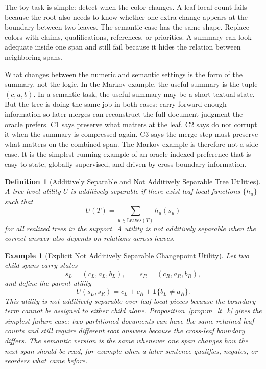 \documentclass[11pt]{article}
\newtheorem{definition}{Definition}
\newtheorem{example}{Example}
\begin{document}
The toy task is simple: detect when the color changes. A leaf-local count fails because the root also needs to know whether one extra change appears at the boundary between two leaves. The semantic case has the same shape. Replace colors with claims, qualifications, references, or priorities. A summary can look adequate inside one span and still fail because it hides the relation between neighboring spans.

What changes between the numeric and semantic settings is the form of the summary, not the logic. In the Markov example, the useful summary is the tuple $(c,a,b)$. In a semantic task, the useful summary may be a short textual state. But the tree is doing the same job in both cases: carry forward enough information so later merges can reconstruct the full-document judgment the oracle prefers. C1 says preserve what matters at the leaf. C2 says do not corrupt it when the summary is compressed again. C3 says the merge step must preserve what matters on the combined span. The Markov example is therefore not a side case. It is the simplest running example of an oracle-indexed preference that is easy to state, globally supervised, and driven by cross-boundary information.

\begin{definition}[Additively Separable and Not Additively Separable Tree Utilities]\label{def:nonseparable}
A tree-level utility $U$ is additively separable if there exist leaf-local functions $\{h_u\}$ such that
\[
U(T)=\sum_{u\in\mathrm{Leaves}(T)} h_u(s_u)
\]
for all realized trees in the support. A utility is not additively separable when the correct answer also depends on relations across leaves.
\end{definition}

\begin{example}[Explicit Not Additively Separable Changepoint Utility]\label{ex:changepoint-nonseparable}
Let two child spans carry states
\[
s_L=(c_L,a_L,b_L),\qquad s_R=(c_R,a_R,b_R),
\]
and define the parent utility
\[
U(s_L,s_R)=c_L+c_R+\mathbf{1}\{b_L\neq a_R\}.
\]
This utility is not additively separable over leaf-local pieces because the boundary term cannot be assigned to either child alone. Proposition~\ref{prop:m_lt_k} gives the simplest failure case: two partitioned documents can have the same retained leaf counts and still require different root answers because the cross-leaf boundary differs. The semantic version is the same whenever one span changes how the next span should be read, for example when a later sentence qualifies, negates, or reorders what came before.
\end{example}
\end{document}
